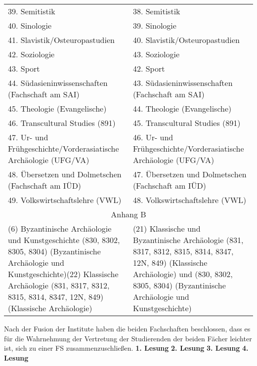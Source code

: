{\begin{longtable}{|p{7.5cm}|p{7.5cm}|}
        39. Semitistik                                                   & 38. Semitistik                                                   \\
        40. Sinologie                                                    & 39. Sinologie                                                    \\
        41. Slavistik/Osteuropastudien                                   & 40. Slavistik/Osteuropastudien                                   \\
        42. Soziologie                                                   & 43. Soziologie                                                   \\
        43. Sport                                                        & 42. Sport                                                        \\
        44. Südasieninwissenschaften (Fachschaft am SAI)                 & 43. Südasieninwissenschaften (Fachschaft am SAI)                 \\
        45. Theologie (Evangelische)                                     & 44. Theologie (Evangelische)                                     \\
        46. Transcultural Studies (891)                                  & 45. Transcultural Studies (891)                                  \\
        47. Ur- und Frühgeschichte/Vorderasiatische Archäologie (UFG/VA) & 46. Ur- und Frühgeschichte/Vorderasiatische Archäologie (UFG/VA) \\
        48. Übersetzen und Dolmetschen (Fachschaft am IÜD)               & 47. Übersetzen und Dolmetschen (Fachschaft am IÜD)               \\
        49. Volkswirtschaftslehre (VWL)                                  & 48. Volkswirtschaftslehre (VWL)                                  \\
        \multicolumn{2}{|c|}{Anhang B}\\\hline
        (6) Byzantinische Archäologie und Kunstgeschichte (830, 8302, 8305, 8304)
        (Byzantinische Archäologie und Kunstgeschichte)\newline (22) Klassische Archäologie (831, 8317, 8312, 8315, 8314, 8347, 12N, 849) (Klassische
        Archäologie) & (21) Klassische und Byzantinische Archäologie (831, 8317, 8312, 8315, 8314, 8347,
        12N, 849) (Klassische Archäologie) und (830, 8302, 8305, 8304) (Byzantinische
        Archäologie und Kunstgeschichte)\\
    \end{longtable}
}{
    Nach der Fusion der Institute haben die beiden Fachschaften beschlossen, dass es für die Wahrnehmung der Vertretung der Studierenden der beiden Fächer leichter ist, sich zu einer FS zusammenzuschließen.
}{
    \textbf{1. Lesung}
    \ul{
    }
    \textbf{2. Lesung}
    \ul{
    }
    \textbf{3. Lesung}
    \ul{
    }
    \textbf{4. Lesung}
    \ul{
    }
}{

}

